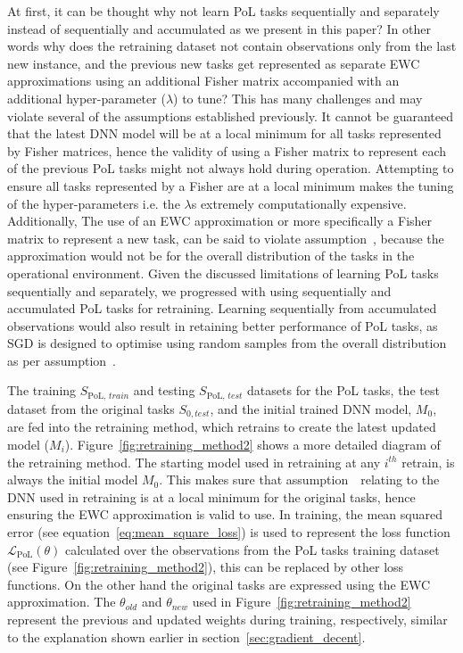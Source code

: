 At first, it can be thought why not learn PoL tasks sequentially and separately instead of sequentially and accumulated as we present in this paper? 
%
In other words why does the retraining dataset not contain observations only from the last new instance, and the previous new tasks get represented as separate EWC approximations using an additional Fisher matrix accompanied with an additional hyper-parameter ($\lambda$) to tune?
%
This has many challenges and may violate several of the assumptions established previously.
%
It cannot be guaranteed that the latest DNN model will be at a local minimum for all tasks represented by Fisher matrices, hence the validity of using a Fisher matrix to represent each of the previous PoL tasks might not always hold during operation.
%
Attempting to ensure all tasks represented by a Fisher are at a local minimum makes the tuning of the hyper-parameters i.e. the $\lambda$s extremely computationally expensive.
%
Additionally, The use of an EWC approximation or more specifically a Fisher matrix to represent a new task, can be said to violate assumption~\assumptionEWCsecond, because the approximation would not be for the overall distribution of the tasks in the operational environment.
%
Given the discussed limitations of learning PoL tasks sequentially and separately, we progressed with using sequentially and accumulated PoL tasks for retraining. 
%
Learning sequentially from accumulated observations would also result in retaining better performance of PoL tasks, as SGD is designed to optimise using random samples from the overall distribution as per assumption~\assumptionSGDfirst.

The training $S_{\text{PoL, }train}$ and testing $S_{\text{PoL, }test}$ datasets for the PoL tasks, the test dataset from the original tasks $S_{0,test}$, and the initial trained DNN model, $M_0$, are fed into the retraining method, which retrains to create the latest updated model ($M_i$). 
%
Figure~\ref{fig:retraining_method2} shows a more detailed diagram of the retraining method.
%
The starting model used in retraining at any $i^{th}$ retrain, is always the initial model $M_0$. This makes sure that assumption~\assumptionEWCfirst~relating to the DNN used in retraining is at a local minimum for the original tasks, hence ensuring the EWC approximation is valid to use.
%
In training, the mean squared error (see equation~\ref{eq:mean_square_loss}) is used to represent the loss function $\mathcal{L}_{\text{PoL}}(\theta)$ calculated over the observations from the PoL tasks training dataset (see Figure~\ref{fig:retraining_method2}), this can be replaced by other loss functions. On the other hand the original tasks are expressed using the EWC approximation. 
%
The $\theta_{old}$ and $\theta_{new}$ used in Figure~\ref{fig:retraining_method2} represent the previous and updated weights during training, respectively, similar to the explanation shown earlier in section~\ref{sec:gradient_decent}.

